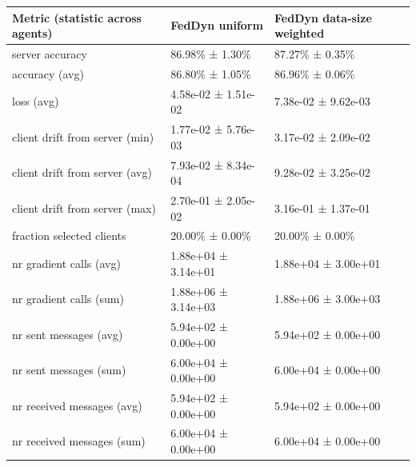 \begin{tabular}{lll}
\hline
 Metric (statistic across agents)   & FedDyn uniform      & FedDyn data-size weighted   \\
\hline
 server accuracy                    & 86.98\% ± 1.30\%      & 87.27\% ± 0.35\%              \\
 accuracy (avg)                     & 86.80\% ± 1.05\%      & 86.96\% ± 0.06\%              \\
 loss (avg)                         & 4.58e-02 ± 1.51e-02 & 7.38e-02 ± 9.62e-03         \\
 client drift from server (min)     & 1.77e-02 ± 5.76e-03 & 3.17e-02 ± 2.09e-02         \\
 client drift from server (avg)     & 7.93e-02 ± 8.34e-04 & 9.28e-02 ± 3.25e-02         \\
 client drift from server (max)     & 2.70e-01 ± 2.05e-02 & 3.16e-01 ± 1.37e-01         \\
 fraction selected clients          & 20.00\% ± 0.00\%      & 20.00\% ± 0.00\%              \\
 nr gradient calls (avg)            & 1.88e+04 ± 3.14e+01 & 1.88e+04 ± 3.00e+01         \\
 nr gradient calls (sum)            & 1.88e+06 ± 3.14e+03 & 1.88e+06 ± 3.00e+03         \\
 nr sent messages (avg)             & 5.94e+02 ± 0.00e+00 & 5.94e+02 ± 0.00e+00         \\
 nr sent messages (sum)             & 6.00e+04 ± 0.00e+00 & 6.00e+04 ± 0.00e+00         \\
 nr received messages (avg)         & 5.94e+02 ± 0.00e+00 & 5.94e+02 ± 0.00e+00         \\
 nr received messages (sum)         & 6.00e+04 ± 0.00e+00 & 6.00e+04 ± 0.00e+00         \\
\hline
\end{tabular}